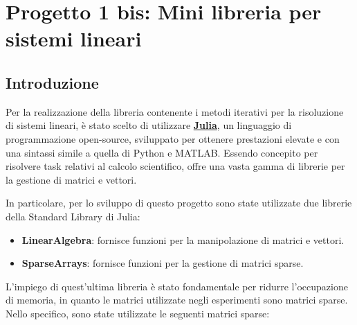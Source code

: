 \chapter{Progetto 1 bis: Mini libreria per sistemi lineari}
\section{Introduzione}\label{sec:intro}
Per la realizzazione della libreria contenente i metodi iterativi per la risoluzione 
di sistemi lineari, è stato scelto di utilizzare \href{https://julialang.org/}{\textbf{Julia}},
un linguaggio di programmazione open-source, sviluppato per ottenere prestazioni
elevate e con una sintassi simile a quella di Python e MATLAB. Essendo concepito
per risolvere task relativi al calcolo scientifico, offre una vasta gamma di
librerie per la gestione di matrici e vettori.

In particolare, per lo sviluppo di questo progetto sono state utilizzate due
librerie della Standard Library di Julia:
\begin{itemize}
    \item \textbf{LinearAlgebra}: fornisce funzioni per la manipolazione di
          matrici e vettori.
    \item \textbf{SparseArrays}: fornisce funzioni per la gestione di matrici sparse.
\end{itemize}

L'impiego di quest'ultima libreria è stato fondamentale per ridurre l'occupazione
di memoria, in quanto le matrici utilizzate negli esperimenti sono matrici sparse.
Nello specifico, sono state utilizzate le seguenti matrici sparse:
\begin{table}[!ht]
    \centering
\end{table}


